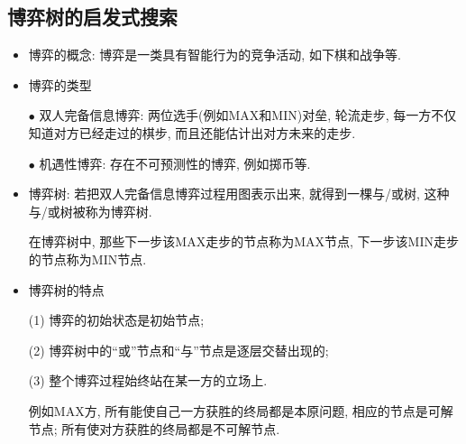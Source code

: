 \subsection{博弈树的启发式搜索}
\begin{itemize}
\item 博弈的概念: 博弈是一类具有智能行为的竞争活动, 如下棋和战争等.
\item 博弈的类型

$\bullet$ 双人完备信息博弈: 两位选手(例如MAX和MIN)对垒, 轮流走步, 每一方不仅知道对方已经走过的棋步, 而且还能估计出对方未来的走步.

$\bullet$ 机遇性博弈: 存在不可预测性的博弈, 例如掷币等.
\item 博弈树: 若把双人完备信息博弈过程用图表示出来, 就得到一棵与/或树, 这种与/或树被称为博弈树.
\begin{example}
    在博弈树中, 那些下一步该MAX走步的节点称为MAX节点, 下一步该MIN走步的节点称为MIN节点.
\end{example}
\item 博弈树的特点

(1) 博弈的初始状态是初始节点;

(2) 博弈树中的“或”节点和“与”节点是逐层交替出现的;

(3) 整个博弈过程始终站在某一方的立场上.
\begin{example}
    例如MAX方, 所有能使自己一方获胜的终局都是本原问题, 相应的节点是可解节点; 所有使对方获胜的终局都是不可解节点.
\end{example}
\end{itemize}

